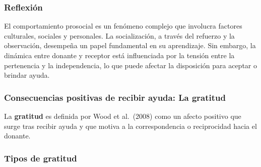 \documentclass[
]{book}
\begin{document}
\subsubsection{Reflexión}\label{reflexiuxf3n-1}

El comportamiento prosocial es un fenómeno complejo que involucra factores culturales, sociales y personales. La socialización, a través del refuerzo y la observación, desempeña un papel fundamental en su aprendizaje. Sin embargo, la dinámica entre donante y receptor está influenciada por la tensión entre la pertenencia y la independencia, lo que puede afectar la disposición para aceptar o brindar ayuda.

\subsubsection{Consecuencias positivas de recibir ayuda: La gratitud}\label{consecuencias-positivas-de-recibir-ayuda-la-gratitud}

La \textbf{gratitud} es definida por Wood et al.~(2008) como un afecto positivo que surge tras recibir ayuda y que motiva a la correspondencia o reciprocidad hacia el donante.

\subsubsection{Tipos de gratitud}\label{tipos-de-gratitud}
\end{document}
